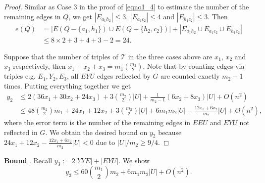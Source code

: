 \documentclass[11pt, reqno]{amsart}    	%
\theoremstyle{definition}
\def\cT{\mathcal T}
\numberwithin{equation}{section}
\begin{document}
\begin{proof}
		Similar as Case 3 in the proof of \eqref{eqno1_4} to estimate the number of the remaining edges in $Q$, we get
		$|E_{a_{1}h_{2}}|\le 3$, $|E_{a_{1}c_{2}}|\le 4$ and $|E_{h_{1}c_{2}}|\le 3$.
		Then 	
		\[\begin{split}
			e(Q)&=|E(Q-\{a_{1}, h_{1}\})\cup E(Q-\{h_{2}, c_{2}\})|+ |E_{a_{1}h_{2}}\cup E_{a_{1}c_{2}} \cup E_{h_{1}c_{2}}|%
			\\&\le 8\times2+3+4+3-2=24.
		\end{split}\]
		
		Suppose that the number of triples of $ \cT $ in the three cases above are $x_1$, $x_2$ and $x_3$ respectively, then $x_1+x_2+x_3=m_1\binom{m_2}{2}$. Note that by counting edges via triples e.g. $E_1,Y_2,E_3$, all $EYU$ edges reflected by $G$ are counted exactly $m_2-1$ times. Putting everything together we get 
		\[\begin{split}
			y_{2}&\le 	2 (36x_1+30x_2+ 24x_3)+3\binom{m_2}{2}|U|+\frac{1}{m_2-1}(6x_2+ 8x_3)|U|+O(n^2) \\
			&\le 48\binom{m_2}{2}m_1 + 24x_1 + 12 x_2 +3\binom{m_2}{2}|U|+6m_1m_2|U|-\frac{12x_1+6x_2}{m_2}|U|+O(n^2),
		\end{split}\]
		where the error term is the number of the remaining edges in $ EEU $ and $ EYU $ not reflected in $G$.
		We obtain the desired bound on $y_2$ because $24x_1 + 12 x_2 -\frac{12x_1+6x_2}{m_2}|U|<0$ due to  $|U|/m_2\ge 9/4$.
	\end{proof}
	
	\noindent\textbf{Bound} .
  Recall $y_{3}:= 2|YYE|+|EYU|$.
	We show \[y_{3}\le 60\binom{m_1}{2}m_2+6m_1m_2|U|+O(n^2).\]
	
\end{document}
